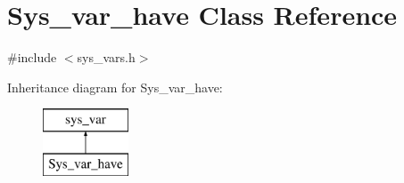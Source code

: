 \hypertarget{classSys__var__have}{}\section{Sys\+\_\+var\+\_\+have Class Reference}
\label{classSys__var__have}


{\ttfamily \#include $<$sys\+\_\+vars.\+h$>$}

Inheritance diagram for Sys\+\_\+var\+\_\+have\+:\begin{figure}[H]
\begin{center}
\leavevmode
\includegraphics[height=2.000000cm]{classSys__var__have}
\end{center}
\end{figure}
